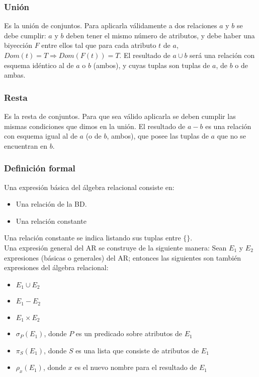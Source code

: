 \documentclass[a4paper]{article}
\begin{document}
\subsubsection*{Uni\'on}
Es la uni\'on de conjuntos. Para aplicarla v\'alidamente a dos relaciones $a$ y $b$ se debe
cumplir: $a$ y $b$ deben tener el mismo n\'umero de atributos, y debe haber una biyecci\'on
$F$ entre ellos tal que para cada atributo $t$ de $a$, $Dom(t) = T \Rightarrow Dom(F(t)) = T$.
El resultado de $a \cup b$ ser\'a una relaci\'on con esquema id\'entico al de $a$ o $b$
(ambos), y cuyas tuplas son tuplas de $a$, de $b$ o de ambas.
\subsubsection*{Resta}
Es la resta de conjuntos. Para que sea v\'alido aplicarla se deben cumplir las mismas
condiciones que dimos en la uni\'on. El resultado de $a - b$ es una relaci\'on con esquema
igual al de $a$ (o de $b$, ambos), que posee las tuplas de $a$ que no se encuentran en $b$.

\subsubsection{Definici\'on formal}
Una expresi\'on b\'asica del \'algebra relacional consiste en:
\begin{itemize}
    \item Una relaci\'on de la BD.
    \item Una relaci\'on constante
\end{itemize}
Una relaci\'on constante se indica listando sus tuplas entre $\{\}$. \\
Una expresi\'on general del AR se construye de la siguiente manera: Sean $E_{1}$ y $E_{2}$
expresiones (b\'asicas o generales) del AR; entonces las siguientes son tambi\'en expresiones
del \'algebra relacional:
\begin{itemize}
    \item $E_{1} \cup E_{2}$
    \item $E_{1} - E_{2}$
    \item $E_{1} \times E_{2}$
    \item $\sigma_{P}(E_{1})$, donde $P$ es un predicado sobre atributos de $E_{1}$
    \item $\pi_{S}(E_{1})$, donde $S$ es una lista que consiste de atributos de $E_{1}$
    \item $\rho_{x}(E_{1})$, donde $x$ es el nuevo nombre para el resultado de $E_{1}$
\end{itemize}
\end{document}
